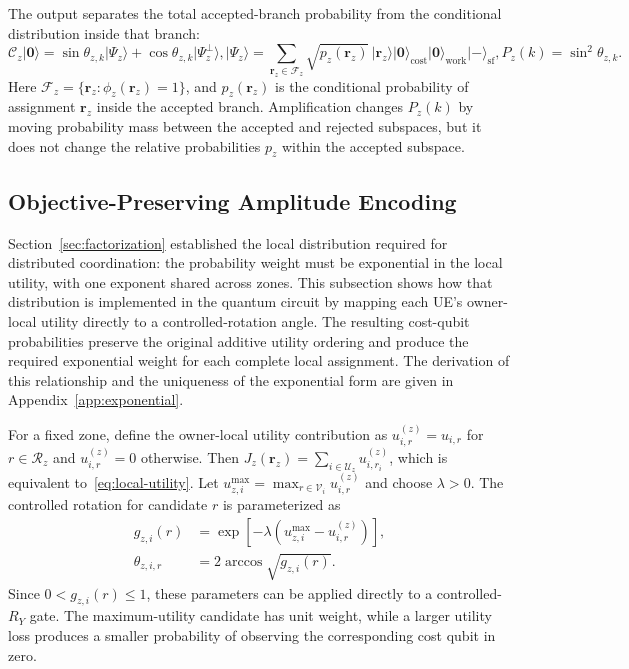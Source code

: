\documentclass[journal]{IEEEtran}
\newcommand{\calC}{\mathcal{C}}  %
\newcommand{\calF}{\mathcal{F}}  %
\newcommand{\calV}{\mathcal{V}}  %
\newcommand{\calU}{\mathcal{U}}  %
\newcommand{\calR}{\mathcal{R}}  %
\newcommand{\ket}[1]{\lvert #1 \rangle}
\begin{document}
The output separates the total accepted-branch probability from the conditional distribution inside that branch:
\begin{subequations}
\label{eq:pipeline}
\begin{equation}
\label{eq:pipeline-branches}
\calC_z\ket{\bm 0}
=
\sin\theta_{z,k}\ket{\Psi_z}
+
\cos\theta_{z,k}\ket{\Psi_z^{\perp}},
\end{equation}
\begin{equation}
\label{eq:accepted-state}
\ket{\Psi_z}
=
\sum_{\bm r_z\in\calF_z}
\sqrt{p_z(\bm r_z)}\,
\ket{\bm r_z}
\ket{\bm 0}_{\mathrm{cost}}
\ket{\bm 0}_{\mathrm{work}}
\ket{-}_{\mathrm{sf}},
\end{equation}
\begin{equation}
\label{eq:accept-probability}
P_z(k)=\sin^2\theta_{z,k}.
\end{equation}
\end{subequations}
Here $\calF_z=\{\bm r_z:\phi_z(\bm r_z)=1\}$, and $p_z(\bm r_z)$ is the conditional probability of assignment $\bm r_z$ inside the accepted branch. Amplification changes $P_z(k)$ by moving probability mass between the accepted and rejected subspaces, but it does not change the relative probabilities $p_z$ within the accepted subspace.

\subsection{Objective-Preserving Amplitude Encoding}
\label{sec:amplitude}

Section~\ref{sec:factorization} established the local distribution required for distributed coordination: the probability weight must be exponential in the local utility, with one exponent shared across zones. This subsection shows how that distribution is implemented in the quantum circuit by mapping each UE's owner-local utility directly to a controlled-rotation angle. The resulting cost-qubit probabilities preserve the original additive utility ordering and produce the required exponential weight for each complete local assignment. The derivation of this relationship and the uniqueness of the exponential form are given in Appendix~\ref{app:exponential}.

For a fixed zone, define the owner-local utility contribution as $u_{i,r}^{(z)}=u_{i,r}$ for $r\in\calR_z$ and $u_{i,r}^{(z)}=0$ otherwise. Then $J_z(\bm r_z)=\sum_{i\in\calU_z}u_{i,r_i}^{(z)}$, which is equivalent to~\eqref{eq:local-utility}. Let $u_{z,i}^{\max}=\max_{r\in\calV_i}u_{i,r}^{(z)}$ and choose $\lambda>0$. The controlled rotation for candidate $r$ is parameterized as
\begin{equation}
\label{eq:theta}
\begin{aligned}
g_{z,i}(r)
&=\exp[-\lambda(u_{z,i}^{\max}-u_{i,r}^{(z)})],\\
\theta_{z,i,r}
&=2\arccos\sqrt{g_{z,i}(r)}.
\end{aligned}
\end{equation}
Since $0<g_{z,i}(r)\le1$, these parameters can be applied directly to a controlled-$R_Y$ gate. The maximum-utility candidate has unit weight, while a larger utility loss produces a smaller probability of observing the corresponding cost qubit in zero.
\end{document}
